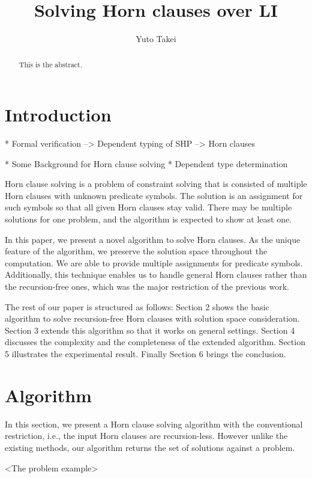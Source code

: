 \documentclass{llncs}
\title{Solving Horn clauses over LI}
\author{Yuto Takei}
\institute{The University of Tokyo}
\begin{document}
\maketitle
\begin{abstract}
  This is the abstract.
\end{abstract}

\section{Introduction}


* Formal verification
--> Dependent typing of SHP
--> Horn clauses

* Some
Background for Horn clause solving
* Dependent type determination

Horn clause solving is a problem of constraint solving that is consisted of multiple Horn clauses with unknown predicate symbols. The solution is an assignment for such symbols so that all given Horn clauses stay valid. There may be multiple solutions for one problem, and the algorithm is expected to show at least one.

In this paper, we present a novel algorithm to solve Horn clauses. As the unique feature of the algorithm, we preserve the solution space throughout the computation. We are able to provide multiple assignments for predicate symbols. Additionally, this technique enables us to handle general Horn clauses rather than the recursion-free ones, which was the major restriction of the previous work.

The rest of our paper is structured as follows: Section 2 shows the basic algorithm to solve recursion-free Horn clauses with solution space consideration. Section 3 extends this algorithm so that it works on general settings. Section 4 discusses the complexity and the completeness of the extended algorithm. Section 5 illustrates the experimental result. Finally Section 6 brings the conclusion.

\section{Algorithm}

In this section, we present a Horn clause solving algorithm with the conventional restriction, i.e., the input Horn clauses are recursion-less. However unlike the existing methods, our algorithm returns the set of solutions against a problem.

<The problem example>
\end{document}
